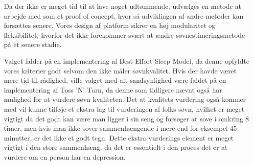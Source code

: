 Da der ikke er meget tid til at lave noget udtømmende, udvælges en metode at arbejde med som et proof of concept, hvor så udviklingen af andre metoder kan forsættes senere.
Vores design af platform sikrer en høj modularitet og fleksibilitet, hvorfor det ikke forekommer svært at ændre søvnestimeringsmetode på et senere stadie.

Valget falder på en implementering af Best Effort Sleep Model, da denne opfyldte vores kriterier godt selvom den ikke måler søvnkvalitet.
Hvis der havde været mere tid til rådighed, ville valget med alt sandsynlighed være faldet på en implementering af Toss 'N' Turn, da denne som tidligere nævnt også har mulighed for at vurdere søvn kvaliteten.
Det at kvalitets vurdering også kommer med vil kunne tilføje et ekstra lag til vurderingen af folks søvn, hvilket er meget vigtigt da det godt kan være man ligger i sin seng og forsøger at sove i omkring 8 timer, men hvis man ikke sover sammenhængende i mere end for eksempel 45 minutter, er det ikke et godt tegn.
Dette ekstra vurderings element er meget vigtigt i den store sammenhæng, da det er essentielt i den proces det er at vurdere om en person har en depression. 
